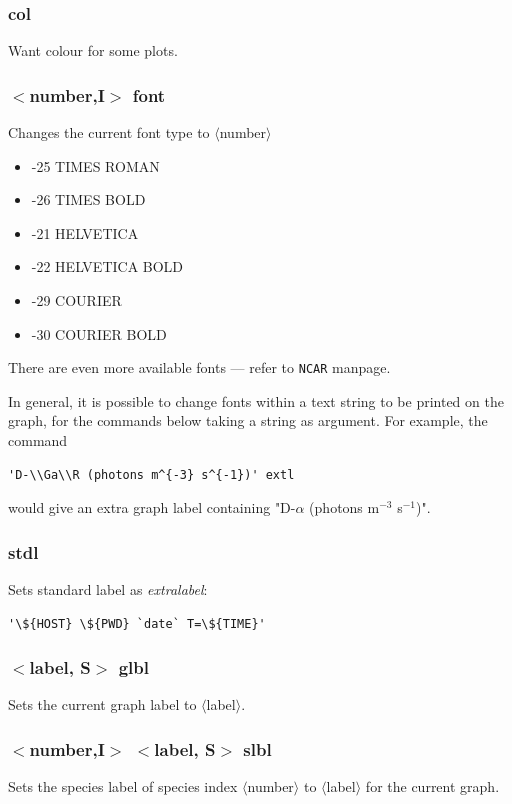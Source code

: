 \documentclass[a4paper,10pt]{report}
\begin{document}
\subsubsection{col}\label{sec:col}
Want colour for some plots.

\subsubsection{$<$number,{\bf I}$>$ font}\label{sec:font}
Changes the current font type to $\langle$number$\rangle$
\begin{itemize}
\item -25 TIMES ROMAN
\item -26 TIMES BOLD
\item -21 HELVETICA
\item -22 HELVETICA BOLD
\item -29 COURIER
\item -30 COURIER BOLD
\end{itemize}
There are even more available fonts --- refer to {\tt NCAR} manpage.

In general, it is possible to change fonts within a text string to be printed
on the graph, for the commands below taking a string as argument. For example,
the command
\begin{verbatim}
'D-\\Ga\\R (photons m^{-3} s^{-1})' extl
\end{verbatim}
would give an extra graph label containing "D-$\alpha$ (photons m$^{-3}$ s$^{-1}$)".

\subsubsection{stdl}\label{sec:stdl}
Sets standard label as {\em extralabel}:
\begin{verbatim}
'\${HOST} \${PWD} `date` T=\${TIME}'
\end{verbatim}

\subsubsection{$<$label, {\bf S}$>$ glbl}\label{sec:glbl}
Sets the current graph label to $\langle$label$\rangle$.

\subsubsection{$<$number,{\bf I}$>$ $<$label, {\bf S}$>$ slbl}\label{sec:slbl}
Sets the species label of species index $\langle$number$\rangle$ to $\langle$label$\rangle$ for the current graph.
\end{document}
